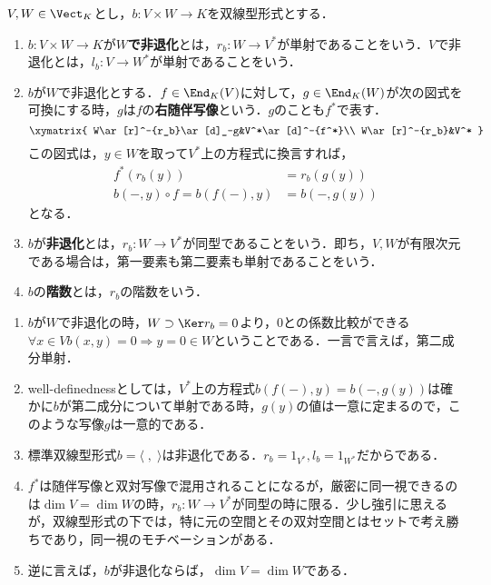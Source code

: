 \documentclass[uplatex, dvipdfmx]{jsreport}
\begin{document}
\begin{definition}
    $V,W\in\Vect_K$とし，$b:V\times W\to K$を双線型形式とする．
    \begin{enumerate}
        \item $b:V\times W\to K$が\textbf{$W$で非退化}とは，$r_b:W\to V^*$が単射であることをいう．$V$で非退化とは，$l_b:V\to W^*$が単射であることをいう．
        \item $b$が$W$で非退化とする．$f\in\End_K(V)$に対して，$g\in\End_K(W)$が次の図式を可換にする時，$g$は$f$の\textbf{右随伴写像}という．$g$のことも$f^*$で表す．
        \[\xymatrix{
            W\ar[r]^-{r_b}\ar[d]_-g&V^*\ar[d]^-{f^*}\\
            W\ar[r]^-{r_b}&V^*
        }\]
        この図式は，$y\in W$を取って$V^*$上の方程式に換言すれば，
        \begin{align*}
            f^*(r_b(y))&=r_b(g(y))\\
            b(-,y)\circ f=b(f(-),y)&=b(-,g(y))
        \end{align*}
        となる．
        \item $b$が\textbf{非退化}とは，$r_b:W\to V^*$が同型であることをいう．即ち，$V,W$が有限次元である場合は，第一要素も第二要素も単射であることをいう．
        \item $b$の\textbf{階数}とは，$r_b$の階数をいう．
    \end{enumerate}
\end{definition}
\begin{remark}[記号の混用]\mbox{}
    \begin{enumerate}
        \item $b$が$W$で非退化の時，$W\supset\Ker r_b=0$より，$0$との係数比較ができる$\forall x\in V b(x,y)=0\Rightarrow y=0\in W$ということである．一言で言えば，第二成分単射．
        \item well-definednessとしては，$V^*$上の方程式$b(f(-),y)=b(-,g(y))$は確かに$b$が第二成分について単射である時，$g(y)$の値は一意に定まるので，このような写像$g$は一意的である．
        \item 標準双線型形式$b=\langle\;,\;\rangle$は非退化である．$r_b=1_{V^*},l_b=1_{W^*}$だからである．
        \item $f^*$は随伴写像と双対写像で混用されることになるが，厳密に同一視できるのは$\dim V=\dim W$の時，$r_b:W\to V^*$が同型の時に限る．少し強引に思えるが，双線型形式の下では，特に元の空間とその双対空間とはセットで考え勝ちであり，同一視のモチベーションがある．
        \item 逆に言えば，$b$が非退化ならば，$\dim V=\dim W$である．
    \end{enumerate}
\end{remark}
\end{document}
